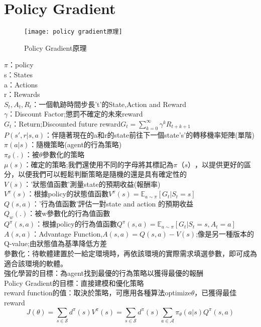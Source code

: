 \section{Policy Gradient}
\begin{figure}[hbt!]
\begin{center}
\texttt{[image: policy gradient原理]}
\caption{\Large Policy Gradient原理}
\label{Policy Gradient原理}
\end{center}
\end{figure}
\hspace{-1.5em}$\pi$：policy\\
s：States\\
a：Actions\\
r：Rewards\\
$S_t,A_t,R_t$：一個軌跡時間步長't'的State,Action and Reward \\
$\gamma$：Discount Factor;懲罰不確定的未來reward\\
$G_t$：Return;Discounted future reward$G_t = \sum_{k=0}^{\infty} \gamma^k R_{t+k+1}$\\
$P(s', r \vert s, a)$：伴隨著現在的a和r的state前往下一個state's'的轉移機率矩陣(單階)\\
$\pi(a \vert s)$：隨機策略(agent的行為策略)\\
$\pi_\theta(.)$：被$\theta$參數化的策略\\
$\mu(s)$：確定的策略;我們還使用不同的字母將其標記為$ \pi（s）$，以提供更好的區分，以便我們可以輕鬆判斷策略是隨機的還是具有確定性的\\
$V(s)$：'狀態值函數'測量state的預期收益(報酬率)\\
$V^\pi(s)$：根據policy的狀態值函數$V^\pi (s) = \mathbb{E}_{a\sim \pi} [G_t \vert S_t = s]$\\
$Q(s, a)$：'行為值函數'評估一對state and action 的預期收益\\
$Q_w(.)$：被w參數化的行為值函數\\
$Q^\pi(s, a)$：根據policy的行為值函數$Q^\pi(s, a) = \mathbb{E}_{a\sim \pi} [G_t \vert S_t = s, A_t = a]$\\
$A(s, a)$：Advantage Function,$A(s, a) = Q(s, a) - V(s)$;像是另一種版本的Q-value;由狀態值為基準降低方差\\
參數化：待軟體建置於一給定環境時，再依該環境的實際需求填選參數，即可成為適合該環境的軟體。\\
強化學習的目標：為agent找到最優的行為策略以獲得最優的報酬\\
Policy Gradient的目標：直接建模和優化策略\\
reward function的值：取決於策略，可應用各種算法optimize$\theta$，已獲得最佳reward\\[5pt]
$$J(\theta) 
= \sum_{s \in \mathcal{S}} d^\pi(s) V^\pi(s) 
= \sum_{s \in \mathcal{S}} d^\pi(s) \sum_{a \in \mathcal{A}} \pi_\theta(a \vert s) Q^\pi(s, a)$$\\
